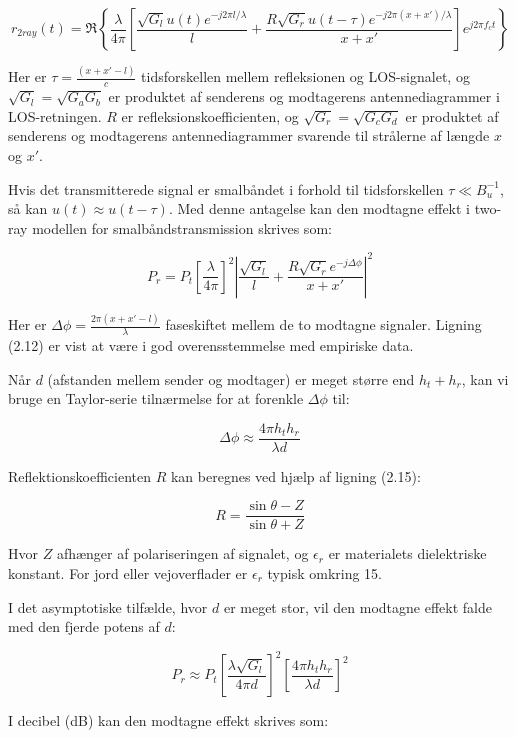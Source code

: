 \documentclass[a4paper,12pt]{book}
\begin{document}
	\[
	r_{2ray}(t) = \Re \left\{ \frac{\lambda}{4\pi} \left[ \frac{\sqrt{G_l} u(t) e^{-j2\pi l/\lambda}}{l} + \frac{R \sqrt{G_r} u(t - \tau) e^{-j2\pi(x+x')/\lambda}}{x + x'} \right] e^{j2\pi f_c t} \right\}
	\]
	
	\noindent
	Her er \( \tau = \frac{(x + x' - l)}{c} \) tidsforskellen mellem refleksionen og LOS-signalet, og \( \sqrt{G_l} = \sqrt{G_a G_b} \) er produktet af senderens og modtagerens antennediagrammer i LOS-retningen. \( R \) er refleksionskoefficienten, og \( \sqrt{G_r} = \sqrt{G_c G_d} \) er produktet af senderens og modtagerens antennediagrammer svarende til strålerne af længde \(x\) og \(x'\).
	
	\noindent
	Hvis det transmitterede signal er smalbåndet i forhold til tidsforskellen \( \tau \ll B_u^{-1} \), så kan \( u(t) \approx u(t - \tau) \). Med denne antagelse kan den modtagne effekt i two-ray modellen for smalbåndstransmission skrives som:
	
	\[
	P_r = P_t \left[ \frac{\lambda}{4\pi} \right]^2 \left| \frac{\sqrt{G_l}}{l} + \frac{R \sqrt{G_r} e^{-j\Delta \phi}}{x + x'} \right|^2
	\]
	
	\noindent
	Her er \( \Delta \phi = \frac{2\pi(x + x' - l)}{\lambda} \) faseskiftet mellem de to modtagne signaler. Ligning (2.12) er vist at være i god overensstemmelse med empiriske data.
	
	\noindent
	Når \( d \) (afstanden mellem sender og modtager) er meget større end \( h_t + h_r \), kan vi bruge en Taylor-serie tilnærmelse for at forenkle \( \Delta \phi \) til:
	
	\[
	\Delta \phi \approx \frac{4\pi h_t h_r}{\lambda d}
	\]
	
	\noindent
	Reflektionskoefficienten \( R \) kan beregnes ved hjælp af ligning (2.15):
	
	\[
	R = \frac{\sin \theta - Z}{\sin \theta + Z}
	\]
	
	\noindent
	Hvor \( Z \) afhænger af polariseringen af signalet, og \( \epsilon_r \) er materialets dielektriske konstant. For jord eller vejoverflader er \( \epsilon_r \) typisk omkring 15.
	
	\noindent
	I det asymptotiske tilfælde, hvor \( d \) er meget stor, vil den modtagne effekt falde med den fjerde potens af \( d \):
	
	\[
	P_r \approx P_t \left[ \frac{\lambda \sqrt{G_l}}{4\pi d} \right]^2 \left[ \frac{4\pi h_t h_r}{\lambda d} \right]^2
	\]
	
	\noindent
	I decibel (dB) kan den modtagne effekt skrives som:
	
\end{document}
